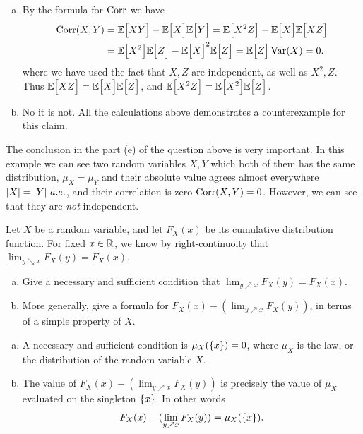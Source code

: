 \begin{solution}
\begin{enumerate}[(a)]
		\item By the formula for $ \operatorname{Corr} $ we have
		\begin{align*}
			\operatorname{Corr}(X,Y) &= \mathbb{E}\big[XY\big] - \mathbb{E}\big[X\big]\mathbb{E}\big[Y\big] = \mathbb{E}\big[X^2Z\big] - \mathbb{E}\big[X\big]\mathbb{E}\big[XZ\big] \\
			&= \mathbb{E}\big[X^2\big]\mathbb{E}\big[Z\big] - \mathbb{E}\big[X\big]^2\mathbb{E}\big[Z\big] = \mathbb{E}\big[Z\big]\operatorname{Var}(X) = 0. 
		\end{align*}
		where we have used the fact that $ X,Z $ are independent, as well as $ X^2, Z $. Thus $ \mathbb{E}\big[XZ\big] = \mathbb{E}\big[X\big]\mathbb{E}\big[Z\big] $, and $  \mathbb{E}\big[X^2Z\big]=\mathbb{E}\big[X^2\big]\mathbb{E}\big[Z\big] $.
		
		\item No it is not. All the calculations above demonstrates a counterexample for this claim.
	\end{enumerate}
\end{solution}

\begin{observation}
	The conclusion in the part (e) of the question above is very important. In this example we can see two random variables $ X,Y $ which both of them has the same distribution, $ \mu_X = \mu_Y $ and their absolute value agrees almost everywhere $ |X| = |Y|\ a.e. $, and their correlation is zero $ \operatorname{Corr}(X,Y) = 0 $. However, we can see that they are \emph{not} independent.
\end{observation}

\begin{problem}
	Let $ X $ be a random variable, and let $ F_X(x) $ be its cumulative distribution function. For fixed $ x\in\mathbb{R} $, we know by right-continuoity that $ \lim_{y\searrow x} F_X(y) = F_X(x) $.
	\begin{enumerate}[(a)]
		\item Give a necessary and sufficient condition that $ \lim_{y\nearrow x}F_X(y) = F_X(x) $.
		\item More generally, give a formula for $ F_X(x) - (\lim_{y\nearrow x}F_X(y)) $, in terms of a simple property of $ X $.
	\end{enumerate}

\end{problem}

\begin{solution}
	\begin{enumerate}[(a)]
		\item A necessary and sufficient condition is $ \mu_X(\{x\}) = 0 $, where $ \mu_X $ is the law, or the distribution of the random variable $ X $.
		\item The value of $ F_X(x) - (\lim_{y\nearrow x}F_X(y)) $ is precisely the value of $ \mu_X $ evaluated on the singleton $ \{x\} $. In other words
		\[ F_X(x) - (\lim_{y\nearrow x}F_X(y)) = \mu_X(\{x\}). \]
	\end{enumerate}
\end{solution}

